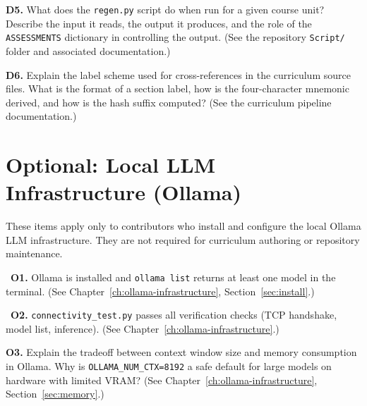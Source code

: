 \begin{Form}
\vs

\noindent\textbf{D5.} What does the \texttt{regen.py} script do
when run for a given course unit? Describe the input it reads,
the output it produces, and the role of the \texttt{ASSESSMENTS}
dictionary in controlling the output.
(See the repository \texttt{Script/} folder and associated
documentation.)\\[4pt]
\TextField[name=d5,width=\linewidth,height=2.5cm,multiline=true,
           bordercolor=black]{}

\vs

\noindent\textbf{D6.} Explain the label scheme used for
cross-references in the curriculum source files. What is the
format of a section label, how is the four-character mnemonic
derived, and how is the hash suffix computed?
(See the curriculum pipeline documentation.)\\[4pt]
\TextField[name=d6,width=\linewidth,height=2.5cm,multiline=true,
           bordercolor=black]{}

\section{Optional: Local LLM Infrastructure (Ollama)}
\label{sec:assess-optional}

These items apply only to contributors who install and configure
the local Ollama LLM infrastructure. They are not required for
curriculum authoring or repository maintenance.

\vs

\noindent\CheckBox[name=o1,width=0.4cm,height=0.4cm]{}~\textbf{O1.}
Ollama is installed and \texttt{ollama list} returns at least one
model in the terminal.
(See Chapter~\ref{ch:ollama-infrastructure},
Section~\ref{sec:install}.)

\vs

\noindent\CheckBox[name=o2,width=0.4cm,height=0.4cm]{}~\textbf{O2.}
\texttt{connectivity\_test.py} passes all verification checks
(TCP handshake, model list, inference).
(See Chapter~\ref{ch:ollama-infrastructure}.)

\vs

\noindent\textbf{O3.} Explain the tradeoff between context window
size and memory consumption in Ollama. Why is
\texttt{OLLAMA\_NUM\_CTX=8192} a safe default for large models on
hardware with limited VRAM?
(See Chapter~\ref{ch:ollama-infrastructure},
Section~\ref{sec:memory}.)\\[4pt]
\TextField[name=o3,width=\linewidth,height=3cm,multiline=true,
           bordercolor=black]{}

\end{Form}